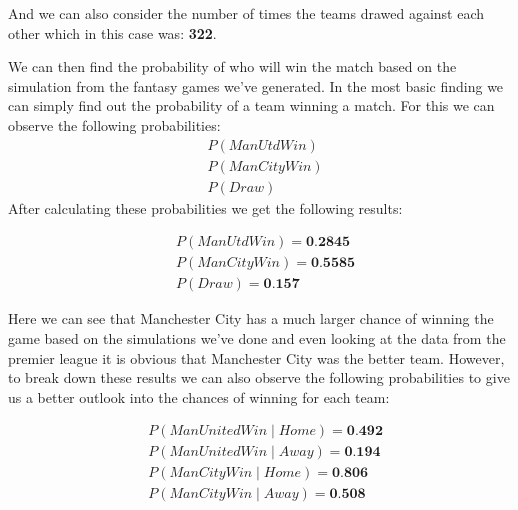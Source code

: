 \documentclass[11pt]{report}
\begin{document}
\vspace{0.3cm}
\noindent
And we can also consider the number of times the teams drawed against each other which in this case was: \textbf{322}.

\vspace{0.3cm}
\noindent
We can then find the probability of who will win the match based on the simulation from the fantasy games we've generated. In the most basic finding we can simply find out the probability of a team winning a match. For this we can observe the following probabilities:
\begin{equation*}
	\begin{aligned}
    	& P(ManUtdWin) \\ 
    	& P(ManCityWin) \\
    	& P(Draw)
	\end{aligned}
\end{equation*}
\noindent
After calculating these probabilities we get the following results:

\vspace{0.3cm}
\noindent
\begin{equation*}
	\begin{aligned}
    	& P(ManUtdWin) = \textbf{0.2845} \\ 
    	& P(ManCityWin) = \textbf{0.5585} \\
    	& P(Draw) = \textbf{0.157}
	\end{aligned}
\end{equation*}

\vspace{0.3cm}
\noindent
Here we can see that Manchester City has a much larger chance of winning the game based on the simulations we've done and even looking at the data from the premier league it is obvious that Manchester City was the better team. However, to break down these results we can also observe the following probabilities to give us a better outlook into the chances of winning for each team:

\vspace{0.3cm}
\noindent
\begin{equation*}
	\begin{aligned}
    	& P(ManUnitedWin \mid Home) = \textbf{0.492}\\ 
    	& P(ManUnitedWin \mid Away) = \textbf{0.194}\\
    	& P(ManCityWin \mid Home) = \textbf{0.806}\\
    	& P(ManCityWin \mid Away) = \textbf{0.508}	
	\end{aligned}
\end{equation*}
\end{document}

